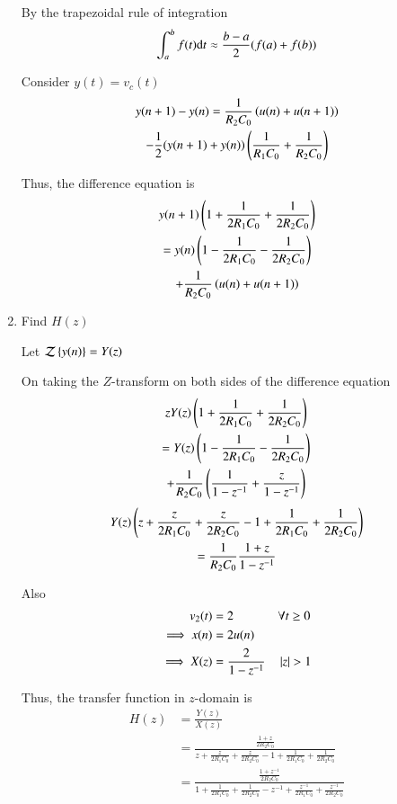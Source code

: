 \documentclass[journal,12pt,twocolumn]{IEEEtran}
\renewcommand\thesection{\arabic{section}}
\begin{document}
\begin{enumerate}[label=\thesection.\arabic*.,ref=\thesection.\theenumi]
    By the trapezoidal rule of integration
    \begin{align}
        \int_a^b f(t) \mathrm{d} t \approx \frac{b-a}{2} (f(a) + f(b))
    \end{align}
    
    Consider $y(t) = v_c(t)$
    \begin{multline}
        y(n+1) - y(n) = \frac{1}{R_2C_0}\left(u(n)+u(n+1)\right) \\
        - \frac12(y(n+1) + y(n))\left(\frac{1}{R_1C_0} + \frac{1}{R_2C_0}\right)
    \end{multline}
    
    Thus, the difference equation is
    \begin{multline}
        y(n+1) \left(1 + \frac{1}{2R_1C_0} + \frac{1}{2R_2C_0}\right) \\= y(n) \left(1 - \frac{1}{2R_1C_0} - \frac{1}{2R_2C_0}\right) \\+ \frac{1}{R_2C_0}\left(u(n)+u(n+1)\right)
    \end{multline}
    
    \item Find $H(z)$
    
    \solution Let ${\mathcal{Z}}\left\{y(n)\right\} = Y(z)$
    
    On taking the $Z$-transform on both sides of the difference equation
    \begin{multline}
        zY(z)\left(1 + \frac{1}{2R_1C_0} + \frac{1}{2R_2C_0}\right) \\= Y(z)\left(1 - \frac{1}{2R_1C_0} - \frac{1}{2R_2C_0}\right) \\+ \frac{1}{R_2C_0} \left(\frac{1}{1-z^{-1}} + \frac{z}{1-z^{-1}}\right)
    \end{multline}
    \begin{multline}
        Y(z)\left(z + \frac{z}{2R_1C_0} + \frac{z}{2R_2C_0} - 1 + \frac{1}{2R_1C_0} + \frac{1}{2R_2C_0}\right) \\
        = \frac{1}{R_2C_0} \frac{1+z}{1-z^{-1}}
    \end{multline}
    
    Also
    \begin{align}
        v_2(t) &= 2 &&\forall t \ge 0\\
        \implies x(n) &= 2u(n) \\
        \implies X(z) &= \frac{2}{1-z^{-1}} &&\left\vert z\right\vert > 1
    \end{align}
    
    Thus, the transfer function in $z$-domain is
    \begin{align}
        H(z) &= \frac{Y(z)}{X(z)} \\
        &= \frac{\frac{1+z}{2R_2C_0}}{z + \frac{z}{2R_1C_0} + \frac{z}{2R_2C_0} - 1 + \frac{1}{2R_1C_0} + \frac{1}{2R_2C_0}} \\
        &= \frac{\frac{1 + z^{-1}}{2R_2C_0}}{1 + \frac{1}{2R_1C_0} + \frac{1}{2R_2C_0} - z^{-1} + \frac{z^{-1}}{2R_1C_0} + \frac{z^{-1}}{2R_2C_0}}
    \end{align}
    

\end{enumerate}
\end{document}
